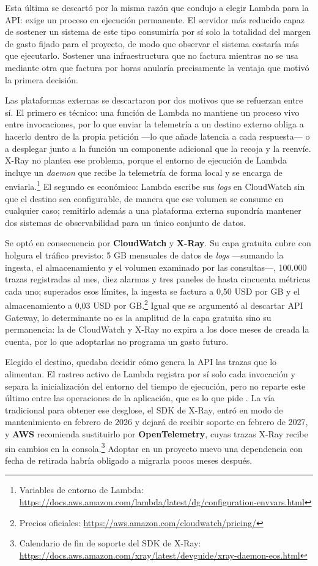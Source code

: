 Esta última se descartó por la misma razón que condujo a elegir Lambda para la API: exige un proceso en ejecución permanente. El servidor más reducido capaz de sostener un sistema de este tipo consumiría por sí solo la totalidad del margen de gasto fijado para el proyecto, de modo que observar el sistema costaría más que ejecutarlo. Sostener una infraestructura que no factura mientras no se usa mediante otra que factura por horas anularía precisamente la ventaja que motivó la primera decisión.

Las plataformas externas se descartaron por dos motivos que se refuerzan entre sí. El primero es técnico: una función de Lambda no mantiene un proceso vivo entre invocaciones, por lo que enviar la telemetría a un destino externo obliga a hacerlo dentro de la propia petición —lo que añade latencia a cada respuesta— o a desplegar junto a la función un componente adicional que la recoja y la reenvíe. X-Ray no plantea ese problema, porque el entorno de ejecución de Lambda incluye un \textit{daemon} que recibe la telemetría de forma local y se encarga de enviarla.\footnote{Variables de entorno de Lambda: \url{https://docs.aws.amazon.com/lambda/latest/dg/configuration-envvars.html}} El segundo es económico: Lambda escribe sus \textit{logs} en CloudWatch sin que el destino sea configurable, de manera que ese volumen se consume en cualquier caso; remitirlo además a una plataforma externa supondría mantener dos sistemas de observabilidad para un único conjunto de datos.

Se optó en consecuencia por \textbf{CloudWatch} y \textbf{X-Ray}. Su capa gratuita cubre con holgura el tráfico previsto: 5 GB mensuales de datos de \textit{logs} —sumando la ingesta, el almacenamiento y el volumen examinado por las consultas—, 100.000 trazas registradas al mes, diez alarmas y tres paneles de hasta cincuenta métricas cada uno; superados esos límites, la ingesta se factura a 0,50 USD por GB y el almacenamiento a 0,03 USD por GB.\footnote{Precios oficiales: \url{https://aws.amazon.com/cloudwatch/pricing/}} Igual que se argumentó al descartar API Gateway, lo determinante no es la amplitud de la capa gratuita sino su permanencia: la de CloudWatch y X-Ray no expira a los doce meses de creada la cuenta, por lo que adoptarlas no programa un gasto futuro.

Elegido el destino, quedaba decidir cómo genera la API las trazas que lo alimentan. El rastreo activo de Lambda registra por sí solo cada invocación y separa la inicialización del entorno del tiempo de ejecución, pero no reparte este último entre las operaciones de la aplicación, que es lo que pide . La vía tradicional para obtener ese desglose, el SDK de X-Ray, entró en modo de mantenimiento en febrero de 2026 y dejará de recibir soporte en febrero de 2027, y \textbf{AWS} recomienda sustituirlo por \textbf{OpenTelemetry}, cuyas trazas X-Ray recibe sin cambios en la consola.\footnote{Calendario de fin de soporte del SDK de X-Ray: \url{https://docs.aws.amazon.com/xray/latest/devguide/xray-daemon-eos.html}} Adoptar en un proyecto nuevo una dependencia con fecha de retirada habría obligado a migrarla pocos meses después.

